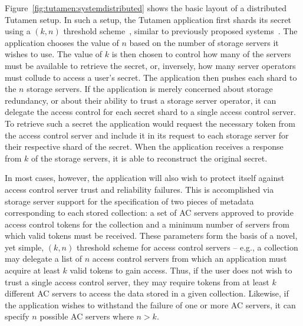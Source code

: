 Figure~\ref{fig:tutamen:systemdistributed} shows the basic layout of a
distributed Tutamen setup. In such a setup, the Tutamen application
first shards its secret using a $(k, n)$ threshold
scheme~\cite{krawczyk1993, shamir1979}, similar to previously proposed
systems~\cite{bessani2011, blaze1996, denning1996}. The application
chooses the value of $n$ based on the number of storage servers it
wishes to use. The value of $k$ is then chosen to control how many of
the servers must be available to retrieve the secret, or, inversely,
how many server operators must collude to access a user's secret. The
application then pushes each shard to the $n$ storage servers. If the
application is merely concerned about storage redundancy, or about
their ability to trust a storage server operator, it can delegate the
access control for each secret shard to a single access control
server. To retrieve such a secret the application would request the
necessary token from the access control server and include it in its
request to each storage server for their respective shard of the
secret. When the application receives a response from $k$ of the
storage servers, it is able to reconstruct the original secret.

In most cases, however, the application will also wish to protect
itself against access control server trust and reliability
failures. This is accomplished via storage server support for the
specification of two pieces of metadata corresponding to each stored
collection: a set of AC servers approved to provide access control
tokens for the collection and a minimum number of servers from which
valid tokens must be received. These parameters form the basis of a
novel, yet simple, $(k, n)$ threshold scheme for access control
servers -- e.g., a collection may delegate a list of $n$ access
control servers from which an application must acquire at least $k$
valid tokens to gain access. Thus, if the user does not wish to trust
a single access control server, they may require tokens from at least
$k$ different AC servers to access the data stored in a given
collection. Likewise, if the application wishes to withstand the
failure of one or more AC servers, it can specify $n$ possible AC
servers where $n > k$.

